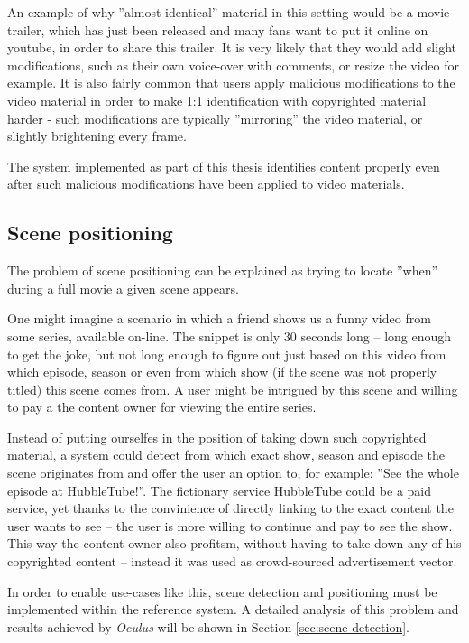 An example of why ''almost identical'' material in this setting would be a movie trailer, which has just been released and many fans want to put it online on youtube, in order to share this trailer. It is very likely that they would add slight modifications, such as their own voice-over with comments, or resize the video for example. It is also fairly common that users apply malicious modifications to the video material in order to make 1:1 identification with copyrighted material harder - such modifications are typically ''mirroring'' the video material, or slightly brightening every frame. 

The system implemented as part of this thesis identifies content properly even after such malicious modifications have been applied to video materials.


\subsection{Scene positioning}
\label{sec:goal-sub-movie}
The problem of scene positioning can be explained as trying to locate ''when'' during a full movie a given scene appears.

One might imagine a scenario in which a friend shows us a funny video from some series, available on-line. The snippet is only 30 seconds long -- long enough to get the joke, but not long enough to figure out just based on this video from which episode, season or even from which show (if the scene was not properly titled) this scene comes from. A user might be intrigued by this scene and willing to pay a the content owner for viewing the entire series. 

Instead of putting ourselfes in the position of taking down such copyrighted material, a system could detect from which exact show, season and episode the scene originates from and offer the user an option to, for example: ''See the whole episode at HubbleTube!''. The fictionary service HubbleTube could be a paid service, yet thanks to the convinience of directly linking to the exact content the user wants to see -- the user is more willing to continue and pay to see the show. This way the content owner also profitsm, without having to take down any of his copyrighted content -- instead it was used as crowd-sourced advertisement vector.

In order to enable use-cases like this, scene detection and positioning must be implemented within the reference system. A detailed analysis of this problem and results achieved by \textit{Oculus} will be shown in Section \ref{sec:scene-detection}.



